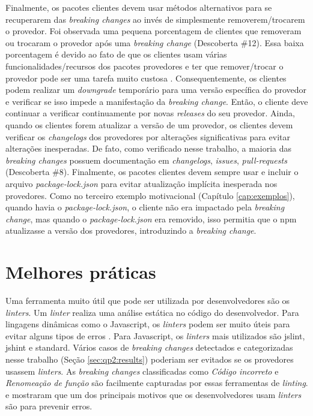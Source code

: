 Finalmente, os pacotes clientes devem usar métodos alternativos para se recuperarem das \textit{breaking changes} ao invés de simplesmente removerem/trocarem o provedor. Foi observada uma pequena porcentagem de clientes que removeram ou trocaram o provedor após uma \textit{breaking change} (Descoberta \#12). Essa baixa porcentagem é devido ao fato de que os clientes usam várias funcionalidades/recursos dos pacotes provedores e ter que remover/trocar o provedor pode ser uma tarefa muito custosa \cite{automating_detecting_third-part_java_migration}. Consequentemente, os clientes podem realizar um \textit{downgrade} temporário para uma versão específica do provedor e verificar se isso impede a manifestação da \textit{breaking change}. Então, o cliente deve continuar a verificar continuamente por novas \textit{releases} do seu provedor. Ainda, quando os clientes forem atualizar a versão de um provedor, os clientes devem verificar os \textit{changelogs} dos provedores por alterações significativas para evitar alterações inesperadas. De fato, como verificado nesse trabalho, a maioria das \textit{breaking changes} possuem documentação em  \textit{changelogs}, \textit{issues}, \textit{pull-requests} (Descoberta \#8). Finalmente, os pacotes clientes devem sempre usar e incluir o arquivo \textit{package-lock.json} para evitar atualização implícita inesperada nos provedores. Como no terceiro exemplo motivacional (Capítulo \ref{cap:exemplos}), quando havia o \textit{package-lock.json}, o cliente não era impactado pela \textit{breaking change}, mas quando o \textit{package-lock.json} era removido, isso permitia que o \textsf{npm} atualizasse a versão dos provedores, introduzindo a \textit{breaking change}.

\section{Melhores práticas}
\label{sub:disc:2}

Uma ferramenta muito útil que pode ser utilizada por desenvolvedores são os \textit{linters}. Um \textit{linter} realiza uma análise estática no código do desenvolvedor. Para lingagens dinâmicas como o \textsf{Javascript}, os \textit{linters} podem ser muito úteis para evitar alguns tipos de erros \cite{js-linters}. Para \textsf{Javascript}, os \textit{linters} mais utilizados são \textsf{jslint}, \textsf{jshint} e \textsf{standard}. Vários casos de \textit{breaking changes} detectados e categorizadas nesse trabalho (Seção \ref{sec:qp2:results}) poderiam ser evitados se os provedores usassem \textit{linters}. As \textit{breaking changes} classificadas como \textit{Código incorreto} e \textit{Renomeação de função} são facilmente capturadas por essas ferramentas de \textit{linting}.  e  mostraram que um dos principais motivos que os desenvolvedores usam \textit{linters} são para prevenir erros.

